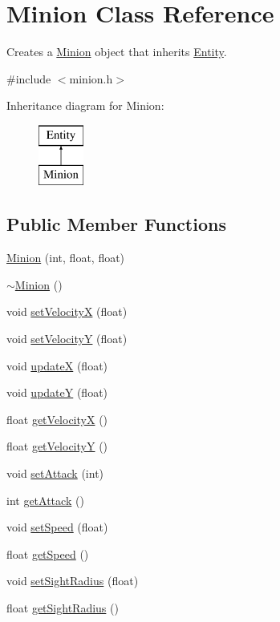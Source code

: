 \hypertarget{class_minion}{\section{Minion Class Reference}
\label{class_minion}
}


Creates a \hyperlink{class_minion}{Minion} object that inherits \hyperlink{class_entity}{Entity}.  




{\ttfamily \#include $<$minion.\+h$>$}

Inheritance diagram for Minion\+:\begin{figure}[H]
\begin{center}
\leavevmode
\includegraphics[height=2.000000cm]{class_minion}
\end{center}
\end{figure}
\subsection*{Public Member Functions}
\begin{DoxyCompactItemize}
\item 
\hyperlink{class_minion_a5b4e32a241d45f654056d2e575d72d8b}{Minion} (int, float, float)
\item 
\hyperlink{class_minion_ae803089a087b250b6d7b5a587963a422}{$\sim$\+Minion} ()
\item 
void \hyperlink{class_minion_a723e8e2a9bb4737001cc9a8a2feb9d8d}{set\+Velocity\+X} (float)
\item 
void \hyperlink{class_minion_a502e2271cc51594feb2be2d937237390}{set\+Velocity\+Y} (float)
\item 
void \hyperlink{class_minion_a78414b6e3f07224891df1861855fafc5}{update\+X} (float)
\item 
void \hyperlink{class_minion_aca2aca7539fa65d04b651bf5d8e8b2f1}{update\+Y} (float)
\item 
float \hyperlink{class_minion_adb0e43ad9ab1ce04824984bb04741dcb}{get\+Velocity\+X} ()
\item 
float \hyperlink{class_minion_a3fa211c53ef3c00caef82a9ec710b566}{get\+Velocity\+Y} ()
\item 
void \hyperlink{class_minion_a312a607ff84baa2bf993cf6c2d799c74}{set\+Attack} (int)
\item 
int \hyperlink{class_minion_a0decd33b01b59bc3a3b67d3cc04c8160}{get\+Attack} ()
\item 
void \hyperlink{class_minion_ada111116801372c4dc670723e98e7e8b}{set\+Speed} (float)
\item 
float \hyperlink{class_minion_ad55df66c5c1c32816da63d7a013491bb}{get\+Speed} ()
\item 
void \hyperlink{class_minion_a61a734d1beb8e71659bf0e59cbb31697}{set\+Sight\+Radius} (float)
\item 
float \hyperlink{class_minion_ada02622b43c158d5da9aa7d21bf64c71}{get\+Sight\+Radius} ()
\end{DoxyCompactItemize}
